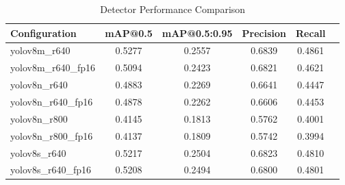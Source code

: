 \begin{table}[htbp]
\centering
\caption{Detector Performance Comparison}
\label{tab:detector_results}
\begin{tabular}{lccccc}
\hline
Configuration & mAP@0.5 & mAP@0.5:0.95 & Precision & Recall \\
\hline
yolov8m_r640 & 0.5277 & 0.2557 & 0.6839 & 0.4861 \\
yolov8m_r640_fp16 & 0.5094 & 0.2423 & 0.6821 & 0.4621 \\
yolov8n_r640 & 0.4883 & 0.2269 & 0.6641 & 0.4447 \\
yolov8n_r640_fp16 & 0.4878 & 0.2262 & 0.6606 & 0.4453 \\
yolov8n_r800 & 0.4145 & 0.1813 & 0.5762 & 0.4001 \\
yolov8n_r800_fp16 & 0.4137 & 0.1809 & 0.5742 & 0.3994 \\
yolov8s_r640 & 0.5217 & 0.2504 & 0.6823 & 0.4810 \\
yolov8s_r640_fp16 & 0.5208 & 0.2494 & 0.6800 & 0.4801 \\
\hline
\end{tabular}
\end{table}